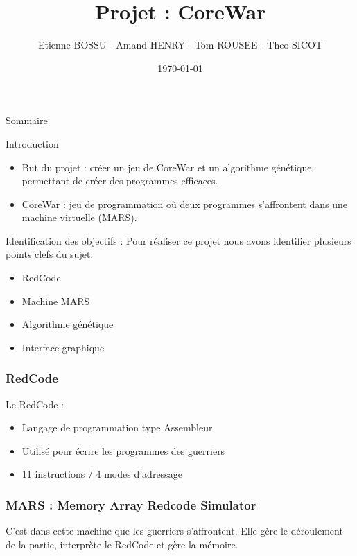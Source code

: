 \documentclass{beamer}
\title{Projet : CoreWar}
\author{Etienne BOSSU - Amand HENRY - Tom ROUSEE - Theo SICOT}
\date{\today}
\begin{document}
\begin{frame}
    \titlepage
\end{frame}

\begin{frame}{Sommaire}
    \tableofcontents
\end{frame}

\begin{frame}{Introduction}
    \begin{itemize}
        \item But du projet : créer un jeu de CoreWar et un algorithme génétique permettant de créer des programmes efficaces.
        \vspace{\baselineskip}
        \item CoreWar : jeu de programmation où deux programmes s'affrontent dans une machine virtuelle (MARS).
    \end{itemize}
\end{frame}

\begin{frame}{Identification des objectifs :}
    Pour réaliser ce projet nous avons identifier plusieurs points clefs  du sujet:
    \vspace{\baselineskip}
    \begin{itemize}
        \item RedCode
        \item Machine MARS
        \item Algorithme génétique
        \item Interface graphique
    \end{itemize}
\end{frame}

\begin{frame}
    \frametitle{RedCode}
    Le RedCode :
    \begin{itemize}
        \item Langage de programmation type Assembleur
        \item Utilisé pour écrire les programmes des guerriers
        \item 11 instructions / 4 modes d'adressage
    \end{itemize}
\end{frame}

\begin{frame}
    \frametitle{MARS : Memory Array Redcode Simulator}
    C'est dans cette machine que les guerriers s'affrontent. Elle gère le déroulement de la partie, interprète le RedCode et gère la mémoire.
\end{frame}
\end{document}

